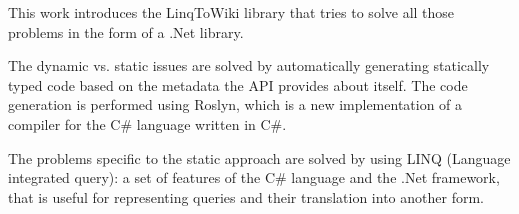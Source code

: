\bigskip

This work introduces the LinqToWiki library that tries to solve all those problems
in the form of a .Net library.

The dynamic vs. static issues are solved by automatically generating statically typed
code based on the metadata the API provides about itself.
The code generation is performed using Roslyn,
which is a new implementation of a compiler for the C\# language written in C\#.

The problems specific to the static approach are solved by using LINQ (Language integrated query):
a set of features of the C\# language and the .Net framework,
that is useful for representing queries and their translation into another form.